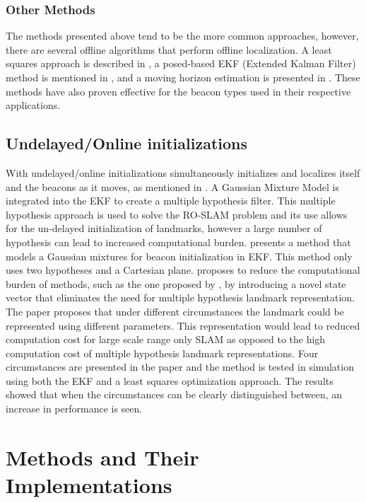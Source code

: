 \documentclass[conference]{IEEEtran}
\begin{document}
			\subsubsection{Other Methods}
			 	The methods presented above tend to be the more common approaches, however, there are several offline algorithms that perform offline localization. A least squares approach is described in \cite{Newman}, a posed-based EKF (Extended Kalman Filter) method is mentioned in \cite{Webster2012}, and a moving horizon estimation is presented in \cite{Vallicrosa2014a}. These methods have also proven effective for the beacon types used in their respective applications.
			

		\subsection{Undelayed/Online initializations}
			With undelayed/online initializations simultaneously initializes and localizes itself and the beacons as it moves, as mentioned in \cite{Caballero2010}. A Gaussian Mixture Model is integrated into the EKF to create a multiple hypothesis filter.  This multiple hypothesis approach is used to solve the RO-SLAM problem and its use allows for the un-delayed initialization of landmarks, however a large number of hypothesis can lead to increased computational burden. \cite{Geneve2015} presents a method that models a Gaussian mixtures for beacon initialization in EKF. This method only uses two hypotheses and a Cartesian plane. \cite{Ahmad2011a} proposes to reduce the computational burden of methods, such as the one proposed by \cite{Caballero2010}, by introducing a novel state vector that eliminates the need for multiple hypothesis landmark representation. The paper proposes that under different circumstances the landmark could be represented using different parameters. This representation would lead to reduced computation cost for large scale range only SLAM as opposed to the high computation cost of multiple hypothesis landmark representations. Four circumstances are presented in the paper and the method is tested in simulation using both the EKF and a least squares optimization approach. The results showed that when the circumstances can be clearly distinguished between, an increase in performance is seen.



	
	

	\section{Methods and Their Implementations}
	\label{methods and their implementations}
	
\end{document}
